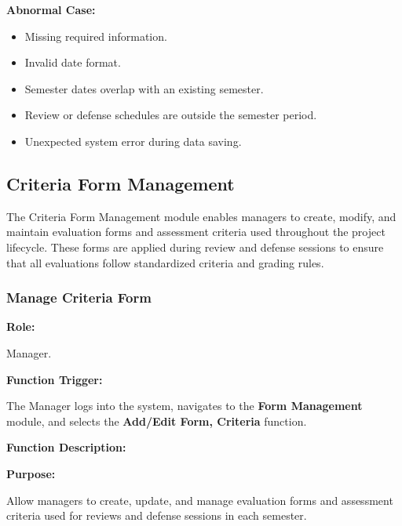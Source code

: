 \vspace{0.2cm}

\textbf{Abnormal Case:}

\begin{itemize}
    \item Missing required information.
    \item Invalid date format.
    \item Semester dates overlap with an existing semester.
    \item Review or defense schedules are outside the semester period.
    \item Unexpected system error during data saving.
\end{itemize}



\subsection{Criteria Form Management}

The Criteria Form Management module enables managers to create, modify, and maintain evaluation forms and assessment criteria used throughout the project lifecycle. These forms are applied during review and defense sessions to ensure that all evaluations follow standardized criteria and grading rules.

\subsubsection{Manage Criteria Form}

\textbf{Role:}

Manager.

\vspace{0.3cm}

\textbf{Function Trigger:}

The Manager logs into the system, navigates to the \textbf{Form Management} module, and selects the \textbf{Add/Edit Form, Criteria} function.

\vspace{0.3cm}

\textbf{Function Description:}

\textbf{Purpose:}

Allow managers to create, update, and manage evaluation forms and assessment criteria used for reviews and defense sessions in each semester.

